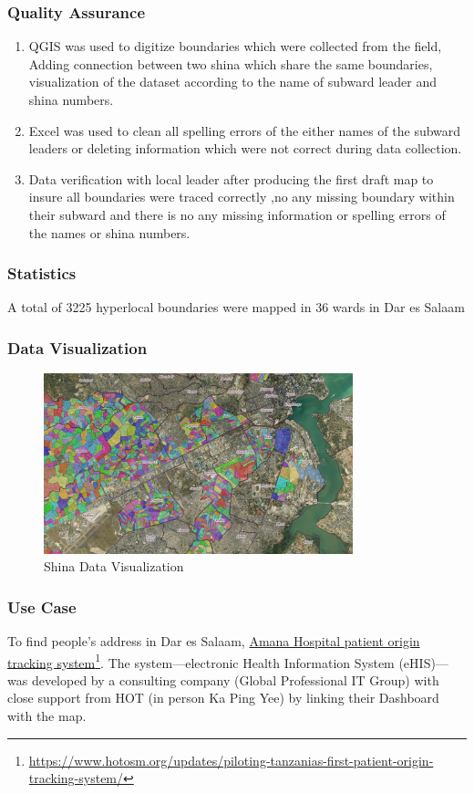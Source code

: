 \documentclass[a4paper,12pt,twoside]{article}
\begin{document}
\subsubsection{Quality Assurance}
\begin{enumerate}
    \item QGIS was used to digitize boundaries which were collected from the field, Adding connection between two shina which share the same boundaries, visualization of the dataset according to the name of subward leader and shina numbers. 
    \item Excel was used to clean all spelling errors of the either names of the subward leaders or deleting information which were not correct during data collection. 
    \item Data verification with local leader after producing the first draft map  to insure all boundaries were traced correctly ,no any missing boundary within their subward and  there is no any missing information or spelling errors of the names or shina numbers. 

\end{enumerate}

\subsubsection{Statistics}
A total of 3225 hyperlocal boundaries were mapped in 36 wards in Dar es Salaam

\subsubsection{Data Visualization}
\begin{figure}[h]
  \color{RHgreen}\caption{Shina Data Visualization}
  \centering
 \includegraphics[width=0.8\textwidth]{images/Shinas_Data_Viz.png}
\end{figure}

\subsubsection{Use Case}
To find people’s address in Dar es Salaam, \href{https://www.hotosm.org/updates/piloting-tanzanias-first-patient-origin-tracking-system/}{Amana Hospital patient origin tracking system}\footnote{\url{https://www.hotosm.org/updates/piloting-tanzanias-first-patient-origin-tracking-system/}}. The system---electronic Health Information System (eHIS)---was developed by a consulting company (Global Professional IT Group) with close support from HOT (in person Ka Ping Yee) by linking their Dashboard with the map.
\end{document}
